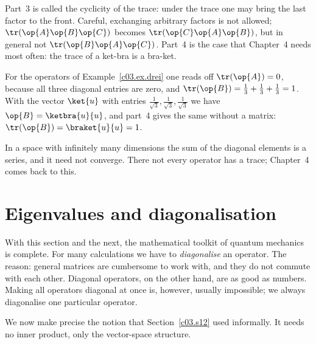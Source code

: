 Part~3 is called the cyclicity of the trace: under the trace one may bring the last factor to the
front. Careful, exchanging arbitrary factors is not allowed; $\tr(\op{A}\op{B}\op{C})$ becomes
$\tr(\op{C}\op{A}\op{B})$, but in general not $\tr(\op{B}\op{A}\op{C})$. Part~4 is the case that
Chapter~4 needs most often: the trace of a ket-bra is a bra-ket.

\begin{example}\label{c03.ex.spur}
  For the operators of Example~\ref{c03.ex.drei} one reads off $\tr(\op{A}) = 0$, because all
  three diagonal entries are zero, and $\tr(\op{B}) = \tfrac13 + \tfrac13 + \tfrac13 = 1$. With
  the vector $\ket{u}$ with entries $\tfrac{1}{\sqrt{3}}, \tfrac{1}{\sqrt{3}}, \tfrac{1}{\sqrt{3}}$
  we have $\op{B} = \ketbra{u}{u}$, and part~4 gives the same without a matrix:
  $\tr(\op{B}) = \braket{u}{u} = 1$.
\end{example}

In a space with infinitely many dimensions the sum of the diagonal elements is a series, and it
need not converge. There not every operator has a trace; Chapter~4 comes back to this.

\section{Eigenvalues and diagonalisation}\label{c03.s14}

With this section and the next, the mathematical toolkit of quantum mechanics is complete. For many
calculations we have to \emph{diagonalise} an operator. The reason: general matrices are
cumbersome to work with, and they do not commute with each other. Diagonal operators, on the
other hand, are as good as numbers. Making all operators diagonal at once is, however, usually
impossible; we always diagonalise one particular operator.

We now make precise the notion that Section~\ref{c03.s12} used informally. It needs no inner
product, only the vector-space structure.

